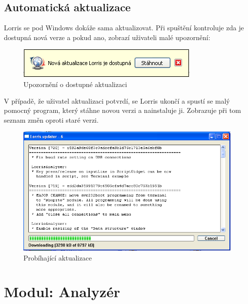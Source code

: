 \documentclass[12pt, a4paper, oneside]{article}
\begin{document}
\subsection{Automatická aktualizace}
Lorris se pod Windows dokáže sama aktualizovat. Při spuštění kontroluje zda je dostupná nová verze a pokud ano, zobrazí uživateli malé upozornění:
\begin{figure}[H]
\begin{center}
\includegraphics[scale=1]{img/update_notify.png}
\caption{Upozornění o dostupné aktualizaci}
\end{center}
\end{figure}
V případě, že uživatel aktualizaci potvrdí, se Lorris ukončí a spustí se malý pomocný program, který stáhne novou verzi a nainstaluje ji. Zobrazuje při tom seznam změn oproti staré verzi.
\begin{figure}[H]
\begin{center}
\includegraphics[width=\textwidth]{img/updater.png}
\caption{Probíhající aktualizace}
\end{center}
\end{figure}

\newpage
\section{Modul: Analyzér}
\end{document}
